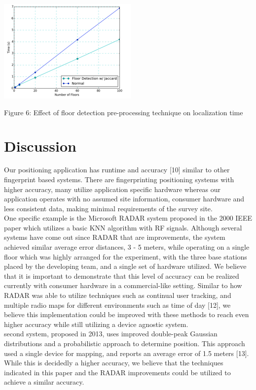 \documentclass[twoside]{article}
\begin{document}
\begin{multicols}{2}
\includegraphics[width=\linewidth]{floorTime}
\begin{center}
Figure 6: Effect of floor detection pre-processing technique on localization time
\end{center}
	
\section{Discussion}

\indent Our positioning application has runtime and accuracy [10] similar to other fingerprint based systems. There are fingerprinting positioning systems with higher accuracy, many utilize application specific hardware whereas our application operates with no assumed site information, consumer hardware and less consistent data, making minimal requirements of the survey site. \\
\indent One specific example is the Microsoft RADAR system proposed in the 2000 IEEE paper which utilizes a basic KNN algorithm with RF signals. Although several systems have come out since RADAR that are improvements, the system achieved similar average error distances, 3 - 5 meters, while operating on a single floor which was highly arranged for the experiment, with the three base stations placed by the developing team, and a single set of hardware utilized. We believe that it is important to demonstrate that this level of accuracy can be realized currently with consumer hardware in a commercial-like setting. Similar to how RADAR was able to utilize techniques such as continual user tracking, and multiple radio maps for different environments such as time of day [12], we believe this implementation could be improved with these methods to reach even higher accuracy while still utilizing a device agnostic system. \\
\indent second system, proposed in 2013, uses improved double-peak Gaussian distributions and a probabilistic approach to determine position. This approach used a single device for mapping, and reports an average error of 1.5 meters [13]. While this is decidedly a higher accuracy, we believe that the techniques indicated in this paper and the RADAR improvements could be utilized to achieve a similar accuracy.
	

\end{multicols}
\end{document}
